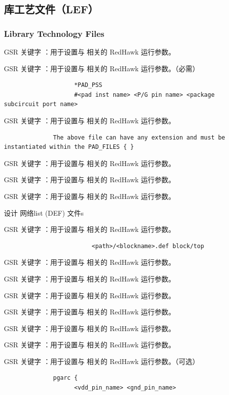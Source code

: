 \subsection{库工艺文件（LEF）}
\subsubsection*{Library Technology Files}

GSR 关键字 ：用于设置与  相关的 RedHawk 运行参数。

GSR 关键字 ：用于设置与  相关的 RedHawk 运行参数。（必需）

\begin{lstlisting}
                    *PAD_PSS
                    #<pad inst name> <P/G pin name> <package subcircuit port name>
\end{lstlisting}

GSR 关键字 ：用于设置与  相关的 RedHawk 运行参数。

\begin{lstlisting}
              The above file can have any extension and must be instantiated within the PAD_FILES { }
\end{lstlisting}

GSR 关键字 ：用于设置与  相关的 RedHawk 运行参数。

GSR 关键字 ：用于设置与  相关的 RedHawk 运行参数。

GSR 关键字 ：用于设置与  相关的 RedHawk 运行参数。

设计 网络list (DEF) 文件s

GSR 关键字 ：用于设置与  相关的 RedHawk 运行参数。

\begin{lstlisting}
                         <path>/<blockname>.def block/top
\end{lstlisting}

GSR 关键字 ：用于设置与  相关的 RedHawk 运行参数。

GSR 关键字 ：用于设置与  相关的 RedHawk 运行参数。

GSR 关键字 ：用于设置与  相关的 RedHawk 运行参数。

GSR 关键字 ：用于设置与  相关的 RedHawk 运行参数。

GSR 关键字 ：用于设置与  相关的 RedHawk 运行参数。

GSR 关键字 ：用于设置与  相关的 RedHawk 运行参数。

GSR 关键字 ：用于设置与  相关的 RedHawk 运行参数。（可选）

\begin{lstlisting}
              pgarc {
                    <vdd_pin_name> <gnd_pin_name>
\end{lstlisting}

